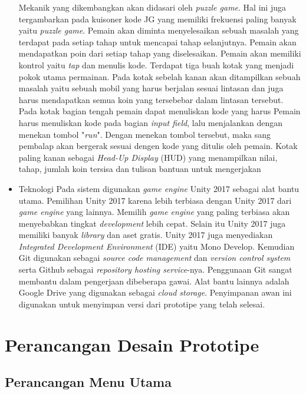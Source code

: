 \begin{itemize}
				\subitem Mekanik yang dikembangkan akan didasari oleh \textit{puzzle game}. Hal ini juga tergambarkan pada kuisoner kode JG yang memiliki frekuensi paling banyak yaitu \textit{puzzle game}. Pemain akan diminta menyelesaikan sebuah masalah yang terdapat pada setiap tahap untuk mencapai tahap selanjutnya.
				\subitem Pemain akan mendapatkan poin dari setiap tahap yang diselesaikan. Pemain akan memiliki kontrol yaitu \textit{tap} dan menulis kode.
				\subitem Terdapat tiga buah kotak yang menjadi pokok utama permainan. Pada kotak sebelah kanan akan ditampilkan sebuah masalah yaitu sebuah mobil yang harus berjalan sesuai lintasan dan juga harus mendapatkan semua koin yang tersebebar dalam lintasan tersebut. Pada kotak bagian tengah pemain dapat menuliskan kode yang harus Pemain harus menuliskan kode pada bagian \textit{input field}, lalu menjalankan dengan menekan tombol "\textit{run}". Dengan menekan tombol tersebut, maka sang pembalap akan bergerak sesuai dengen kode yang ditulis oleh pemain. Kotak paling kanan sebagai \textit{Head-Up Display} (HUD) yang menampilkan nilai, tahap, jumlah koin tersisa dan tulisan bantuan untuk mengerjakan 
			\item Teknologi
				\subitem Pada sistem digunakan \textit{game engine} Unity 2017 sebagai alat bantu utama. Pemilihan Unity 2017 karena \saya lebih terbiasa dengan Unity 2017 dari \textit{game engine} yang lainnya. Memilih \textit{game engine} yang paling terbiasa akan menyebabkan tingkat \textit{development} lebih cepat. Selain itu Unity 2017 juga memiliki banyak \textit{library} dan aset gratis. Unity 2017 juga menyediakan \textit{Integrated Development Environment} (IDE) yaitu Mono Develop.
				\subitem Kemudian Git digunakan sebagai \textit{source code management} dan \textit{version control system} serta Github sebagai \textit{repository hosting service}-nya. Penggunaan Git sangat membantu dalam pengerjaan dibeberapa gawai.
				\subitem Alat bantu lainnya adalah Google Drive yang digunakan sebagai \textit{cloud storage}. Penyimpanan awan ini digunakan untuk menyimpan versi dari prototipe yang telah selesai.
		\end{itemize}

\section{Perancangan Desain Prototipe}

	\subsection{Perancangan Menu Utama}
	
